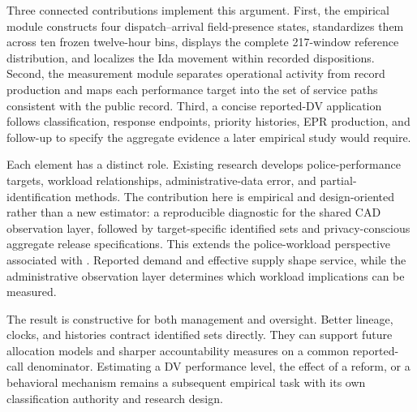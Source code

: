 \documentclass[11pt]{article}
\begin{document}
Three connected contributions implement this argument. First, the empirical module constructs four dispatch--arrival field-presence states, standardizes them across ten frozen twelve-hour bins, displays the complete 217-window reference distribution, and localizes the Ida movement within recorded dispositions. Second, the measurement module separates operational activity from record production and maps each performance target into the set of service paths consistent with the public record. Third, a concise reported-DV application follows classification, response endpoints, priority histories, EPR production, and follow-up to specify the aggregate evidence a later empirical study would require.

Each element has a distinct role. Existing research develops police-performance targets, workload relationships, administrative-data error, and partial-identification methods. The contribution here is empirical and design-oriented rather than a new estimator: a reproducible diagnostic for the shared CAD observation layer, followed by target-specific identified sets and privacy-conscious aggregate release specifications. This extends the police-workload perspective associated with \citet{Beland2026}. Reported demand and effective supply shape service, while the administrative observation layer determines which workload implications can be measured.

The result is constructive for both management and oversight. Better lineage, clocks, and histories contract identified sets directly. They can support future allocation models and sharper accountability measures on a common reported-call denominator. Estimating a DV performance level, the effect of a reform, or a behavioral mechanism remains a subsequent empirical task with its own classification authority and research design.
\end{document}
